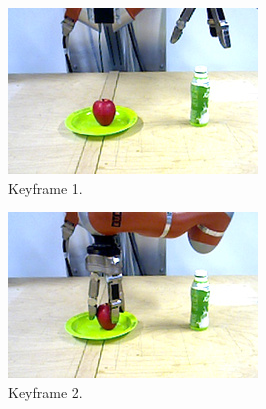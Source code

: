 \begin{figure}
  \centering
  \begin{subfigure}[t]{0.475\textwidth}
    \includegraphics[width=\textwidth]{./figures/sec/planning/exec3/frame0493.jpg}
    \caption{Keyframe 1.}
    \label{fig:sec_usingaffordanceforplanning_results_scenario3_1}
  \end{subfigure}
  \hfill
  \begin{subfigure}[t]{0.475\textwidth}
    \includegraphics[width=\textwidth]{./figures/sec/planning/exec3/frame0837.jpg}
    \caption{Keyframe 2.}
    \label{fig:sec_usingaffordanceforplanning_results_scenario3_2}
  \end{subfigure}\\%
  \begin{subfigure}[t]{0.475\textwidth}

\end{subfigure}
\end{figure}
